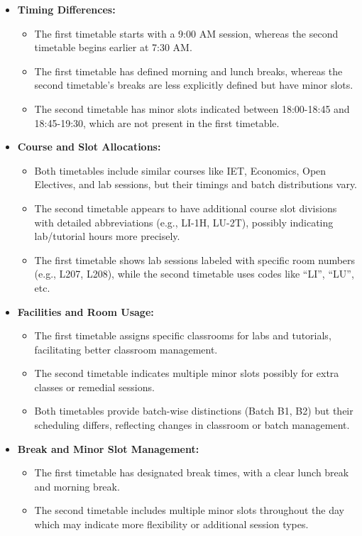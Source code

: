 \documentclass[12pt]{article}
\begin{document}
\begin{itemize}[leftmargin=*]
\item \textbf{Timing Differences:}
\begin{itemize}
    \item The first timetable starts with a 9:00 AM session, whereas the second timetable begins earlier at 7:30 AM.
    \item The first timetable has defined morning and lunch breaks, whereas the second timetable’s breaks are less explicitly defined but have minor slots.
    \item The second timetable has minor slots indicated between 18:00-18:45 and 18:45-19:30, which are not present in the first timetable.
\end{itemize}

\item \textbf{Course and Slot Allocations:}
\begin{itemize}
    \item Both timetables include similar courses like IET, Economics, Open Electives, and lab sessions, but their timings and batch distributions vary.
    \item The second timetable appears to have additional course slot divisions with detailed abbreviations (e.g., LI-1H, LU-2T), possibly indicating lab/tutorial hours more precisely.
    \item The first timetable shows lab sessions labeled with specific room numbers (e.g., L207, L208), while the second timetable uses codes like “LI”, “LU”, etc.
\end{itemize}

\item \textbf{Facilities and Room Usage:}
\begin{itemize}
    \item The first timetable assigns specific classrooms for labs and tutorials, facilitating better classroom management.
    \item The second timetable indicates multiple minor slots possibly for extra classes or remedial sessions.
    \item Both timetables provide batch-wise distinctions (Batch B1, B2) but their scheduling differs, reflecting changes in classroom or batch management.
\end{itemize}

\item \textbf{Break and Minor Slot Management:}
\begin{itemize}
    \item The first timetable has designated break times, with a clear lunch break and morning break.
    \item The second timetable includes multiple minor slots throughout the day which may indicate more flexibility or additional session types.
\end{itemize}
\end{itemize}
\end{document}
